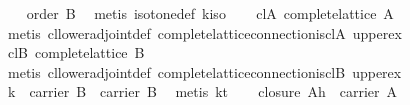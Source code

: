 \begin{isabellebody}
\isanewline
\ \ \isamarkupfalse%
\ {}order\ B{}\ \isamarkupfalse%
\ {}metis\ isotone{}def\ kiso{}\isanewline
\isanewline
\ \ \isamarkupfalse%
\ cl{}A{}\ {}complete{}lattice\ A{}\isanewline
\ \ \ \ \isamarkupfalse%
\ {}metis\ cl{}lower{}adjoint{}def\ complete{}lattice{}connection{}is{}cl{}A\ upper{}ex{}\isanewline
\isanewline
\ \ \isamarkupfalse%
\ cl{}B{}\ {}complete{}lattice\ B{}\isanewline
\ \ \ \ \isamarkupfalse%
\ {}metis\ cl{}lower{}adjoint{}def\ complete{}lattice{}connection{}is{}cl{}B\ upper{}ex{}\isanewline
\isanewline
\ \ \isamarkupfalse%
\ {}k\ {}\ carrier\ B\ {}\ carrier\ B{}\ \isamarkupfalse%
\ {}metis\ kt{}\isanewline
\isanewline
\ \ \isamarkupfalse%
\ closure{}{}\ {}{}\isactrlbsub A\isactrlesub h\ {}\ carrier\ A{}\ \isamarkupfalse%

\end{isabellebody}
